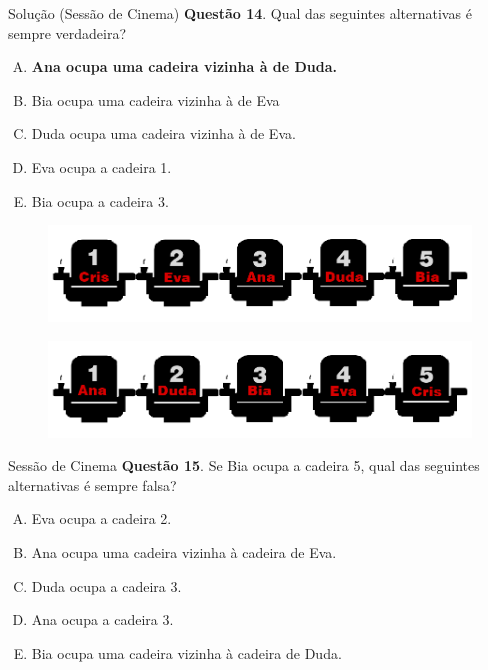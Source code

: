 \documentclass{beamer}
\begin{document}
\begin{frame}{Solução (Sessão de Cinema)}
\textbf{Questão 14}. Qual das seguintes alternativas é
sempre verdadeira?
\begin{enumerate}[(A)]
    \item  \textbf{Ana ocupa uma cadeira vizinha à de Duda.}
    \item Bia ocupa uma cadeira vizinha à de Eva
    \item Duda ocupa uma cadeira vizinha à de Eva.
    \item Eva ocupa a cadeira 1.
    \item Bia ocupa a cadeira 3.
\end{enumerate}
        \begin{figure}[ht]
        \centering
        \includegraphics[width=.8\textwidth]{nomes 3.png}
        \label{fig:exampleFig2}
        \end{figure}
         \begin{figure}[ht]
        \centering
        \includegraphics[width=.8\textwidth]{nome6.png}
        \label{fig:exampleFig2}
        \end{figure}

\end{frame}

\begin{frame}{Sessão de Cinema}
\textbf{Questão 15}. Se Bia ocupa a cadeira 5, qual das seguintes alternativas é sempre falsa?

\begin{enumerate}[(A)]
    \item Eva ocupa a cadeira 2.
    \item Ana ocupa uma cadeira vizinha à cadeira de Eva.
    \item Duda ocupa a cadeira 3.
    \item Ana ocupa a cadeira 3.
    \item Bia ocupa uma cadeira vizinha à cadeira de Duda.

\end{enumerate}
\end{frame}
\end{document}
